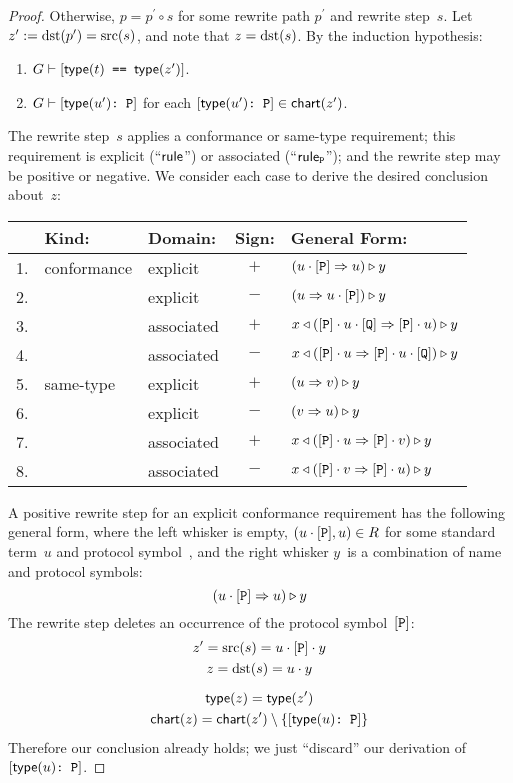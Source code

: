 \documentclass[../generics]{subfiles}
\begin{document}
\begin{proof}
\InductiveStep Otherwise, $p=p^\prime \circ s$ for some rewrite path $p^\prime$ and rewrite step~$s$. Let $z^\prime := \operatorname{dst}(p^\prime) = \operatorname{src}(s)$, and note that $z=\operatorname{dst}(s)$. By the induction hypothesis:
\begin{enumerate}
\item $G \vdash [\texttt{$\mathsf{type}(t)$ == $\mathsf{type}(z^\prime)$}]$.
\item $G \vdash [\texttt{$\mathsf{type}(u^\prime)$:~P}]$ for each $[\texttt{$\mathsf{type}(u^\prime)$:~P}]\in\mathsf{chart}(z^\prime)$.
\end{enumerate}
The rewrite step~$s$ applies a conformance or same-type requirement; this requirement is explicit (``$\mathsf{rule}$'') or associated (``$\mathsf{rule}_{\texttt{P}}$''); and the rewrite step may be positive or negative. We consider each case to derive the desired conclusion about~$z$:
\begin{center}
\begin{tabular}{lllcl}
\toprule
&\textbf{Kind:}&\textbf{Domain:}&\textbf{Sign:}&\textbf{General Form:}\\
\midrule
1.&conformance&explicit&$+$&$(u\cdot[\texttt{P}]\Rightarrow u)\triangleright y$\\
2.&&explicit&$-$&$(u\Rightarrow u\cdot[\texttt{P}])\triangleright y$\\
3.&&associated&$+$&$x\triangleleft([\texttt{P}]\cdot u\cdot[\texttt{Q}]\Rightarrow[\texttt{P}]\cdot u)\triangleright y$\\
4.&&associated&$-$&$x\triangleleft([\texttt{P}]\cdot u\Rightarrow[\texttt{P}]\cdot u\cdot[\texttt{Q}])\triangleright y$\\
\midrule
5.&same-type&explicit&$+$&$(u\Rightarrow v)\triangleright y$\\
6.&&explicit&$-$&$(v\Rightarrow u)\triangleright y$\\
7.&&associated&$+$&$x\triangleleft([\texttt{P}]\cdot u\Rightarrow[\texttt{P}]\cdot v)\triangleright y$\\
8.&&associated&$-$&$x\triangleleft([\texttt{P}]\cdot v\Rightarrow[\texttt{P}]\cdot u)\triangleright y$\\
\bottomrule
\end{tabular}
\end{center}

 A positive rewrite step for an explicit conformance requirement has the following general form, where the left whisker is empty, $(u\cdot[\texttt{P}],u)\in R$ for some standard term~$u$ and protocol symbol~\pP, and the right whisker $y$~is a combination of name and protocol symbols:
\[(u\cdot[\texttt{P}]\Rightarrow u)\triangleright y\]
The rewrite step deletes an occurrence of the protocol symbol~$[\texttt{P}]$:
\begin{gather*}
z^\prime=\operatorname{src}(s)=u\cdot[\texttt{P}]\cdot y\\
z=\operatorname{dst}(s)=u\cdot y\\[\medskipamount]
\mathsf{type}(z)=\mathsf{type}(z^\prime)\\
\mathsf{chart}(z)=\mathsf{chart}(z^\prime) \setminus \{[\texttt{$\mathsf{type}(u)$:~P}]\}
\end{gather*}
Therefore our conclusion already holds; we just ``discard'' our derivation of $[\texttt{$\mathsf{type}(u)$:~P}]$.


\end{proof}
\end{document}
